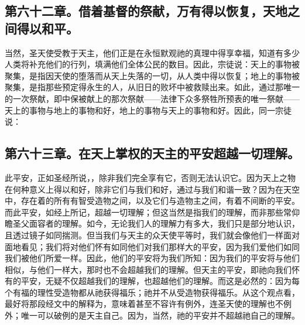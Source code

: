 
\subsection{第六十二章。借着基督的祭献，万有得以恢复，天地之间得以和平。}

当然，圣天使受教于天主，他们正是在永恒默观祂的真理中得享幸福，知道有多少人类将补充他们的行列，填满他们全体公民的数目。\newline{}因此，宗徒说：\newline{}天上的事物被聚集，是指因天使的堕落而从天上失落的一切，从人类中得以恢复；\newline{}地上的事物被聚集，是指那些预定得永生的人，从旧日的败坏中被救赎出来。\newline{}如此，通过那唯一的一次祭献，即中保被献上的那次祭献——法律下众多祭牲所预表的唯一祭献——天上的事物与地上的事物和好，地上的事物与天上的事物和好。\newline{}因此，同一宗徒说：\par


\subsection{第六十三章。在天上掌权的天主的平安超越一切理解。}

此平安，正如圣经所说，，除非我们完全享有它，否则无法认识它。因为天上之物在何种意义上得以和好，除非它们与我们和好，通过与我们和谐一致？因为在天空中，存在着的所有有智受造物之间，以及它们与造物主之间，有着不间断的平安。而此平安，如经上所记，超越一切理解；但这当然是指我们的理解，而非那些常仰瞻圣父面容者的理解。如今，无论我们人的理解力有多大，我们只是部分地认识，且透过镜子如同揣测。但当我们与天主的众天使平等时，我们就会像他们一样面对面地看见；我们将对他们怀有如同他们对我们那样大的平安，因为我们爱他们如同我们被他们所爱一样。因此，他们的平安将为我们所知：因为我们的平安将与他们相似，与他们一样大，那时也不会超越我们的理解。但天主的平安，即祂向我们怀有的平安，无疑不仅超越我们的理解，也超越他们的理解。而这是必然的：因为每个有福的理性受造物都从祂获得福乐；祂并不从受造物获得福乐。从这个观点看，最好将那段经文中的解释为，意味着甚至不容许有例外，连圣天使的理解也不例外；唯一可以破例的是天主自己。因为，当然，祂的平安并不超越祂自己的理解。\par

